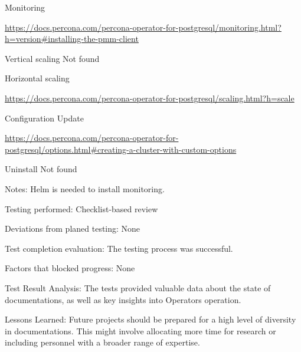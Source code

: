 Monitoring

\url{https://docs.percona.com/percona-operator-for-postgresql/monitoring.html?h=version#installing-the-pmm-client}

Vertical scaling
Not found

Horizontal scaling

\url{https://docs.percona.com/percona-operator-for-postgresql/scaling.html?h=scale}

Configuration Update

\url{https://docs.percona.com/percona-operator-for-postgresql/options.html#creating-a-cluster-with-custom-options}

Uninstall
Not found

Notes: Helm is needed to install monitoring.

Testing performed: Checklist-based review

Deviations from planed testing: None

Test completion evaluation: The testing process was successful.

Factors that blocked progress: None

Test Result Analysis: The tests provided valuable data about the state of documentations, as well as key insights into Operators operation.

Lessons Learned: Future projects should be prepared for a high level of diversity in documentations. This might involve allocating more time for research or including personnel with a broader range of expertise.


